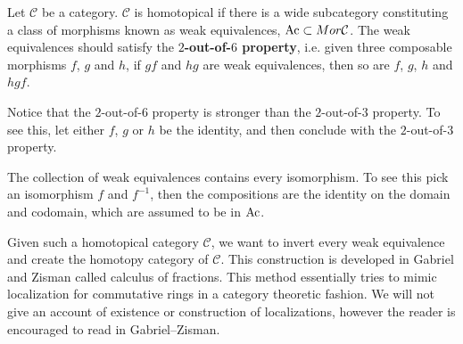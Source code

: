\documentclass[../thesis.tex]{subfiles}
\begin{document}
            \begin{definition}
                Let $\mathcal{C}$ be a category. $\mathcal{C}$ is homotopical if there is a wide subcategory constituting a class of morphisms known as weak equivalences, $\tt{Ac}\subset Mor\mathcal{C}$. The weak equivalences should satisfy the \textbf{$2$-out-of-$6$ property}, i.e. given three composable morphisms $f$, $g$ and $h$, if $gf$ and $hg$ are weak equivalences, then so are $f$, $g$, $h$ and $hgf$.

                \begin{center}
                \end{center}
            \end{definition}

            \begin{remark}
                Notice that the $2$-out-of-$6$ property is stronger than the $2$-out-of-$3$ property. To see this, let either $f$, $g$ or $h$ be the identity, and then conclude with the $2$-out-of-$3$ property.
            \end{remark}

            \begin{remark}
                The collection of weak equivalences contains every isomorphism. To see this pick an isomorphism $f$ and $f^{-1}$, then the compositions are the identity on the domain and codomain, which are assumed to be in $\tt{Ac}$.
            \end{remark}
            
            Given such a homotopical category $\mathcal{C}$, we want to invert every weak equivalence and create the homotopy category of $\mathcal{C}$. This construction is developed in Gabriel and Zisman \cite{Zisman67} called calculus of fractions. This method essentially tries to mimic localization for commutative rings in a category theoretic fashion. We will not give an account of existence or construction of localizations, however the reader is encouraged to read in Gabriel--Zisman.
\end{document}
